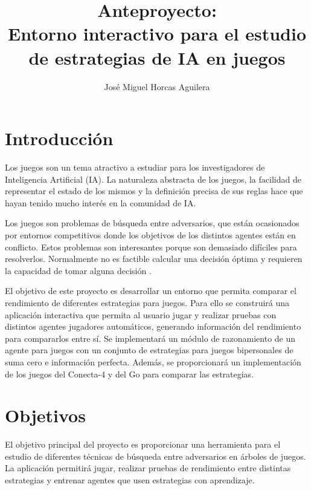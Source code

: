 \documentclass[a4paper,12pt]{article}
\title{Anteproyecto:\\Entorno interactivo para el estudio de estrategias de IA en juegos}
\author{José Miguel Horcas Aguilera}
\begin{document}

\maketitle			%

\begin{abstract} 	%
\par 

\end{abstract}

\tableofcontents	%
\clearpage

\section{Introducción}
\par 
Los juegos son un tema atractivo a estudiar para los investigadores de Inteligencia Artificial (IA).
La naturaleza abstracta de los juegos, la facilidad de representar el estado de los mismos y la definición precisa de sus reglas hace que hayan tenido mucho interés en la comunidad de IA.

\par 
Los juegos son problemas de búsqueda entre adversarios, que están ocasionados por entornos competitivos donde los objetivos de los distintos agentes están en conflicto.
Estos problemas son interesantes porque son demasiado difíciles para resolverlos.
Normalmente no es factible calcular una decisión óptima y requieren la capacidad de tomar alguna decisión \cite{RN03, N01}.

\par 
El objetivo de este proyecto es desarrollar un entorno que permita comparar el rendimiento de diferentes estrategias para juegos.
Para ello se construirá una aplicación interactiva que permita al usuario jugar y realizar pruebas con distintos agentes jugadores automáticos, generando información del rendimiento para compararlos entre sí.
Se implementará un módulo de razonamiento de un agente para juegos con un conjunto de estrategias para juegos bipersonales de suma cero e información perfecta. 
Además, se proporcionará un implementación de los juegos del Conecta-4 y del Go para comparar las estrategias.

\section{Objetivos}
\par 
El objetivo principal del proyecto es proporcionar una herramienta para el estudio de diferentes técnicas de búsqueda entre adversarios en árboles de juegos.
La aplicación permitirá jugar, realizar pruebas de rendimiento entre distintas estrategias y entrenar agentes que usen estrategias con aprendizaje.
\end{document}
